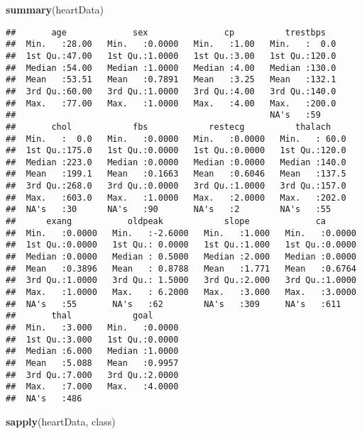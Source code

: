 \documentclass[
]{article}
\newenvironment{Shaded}{\begin{snugshade}}{\end{snugshade}}
\newcommand{\KeywordTok}[1]{\textcolor[rgb]{0.13,0.29,0.53}{\textbf{#1}}}
\newcommand{\NormalTok}[1]{#1}
\begin{document}
\begin{Shaded}
\begin{Highlighting}[]
\KeywordTok{summary}\NormalTok{(heartData)}
\end{Highlighting}
\end{Shaded}

\begin{verbatim}
##       age             sex               cp          trestbps    
##  Min.   :28.00   Min.   :0.0000   Min.   :1.00   Min.   :  0.0  
##  1st Qu.:47.00   1st Qu.:1.0000   1st Qu.:3.00   1st Qu.:120.0  
##  Median :54.00   Median :1.0000   Median :4.00   Median :130.0  
##  Mean   :53.51   Mean   :0.7891   Mean   :3.25   Mean   :132.1  
##  3rd Qu.:60.00   3rd Qu.:1.0000   3rd Qu.:4.00   3rd Qu.:140.0  
##  Max.   :77.00   Max.   :1.0000   Max.   :4.00   Max.   :200.0  
##                                                  NA's   :59     
##       chol            fbs            restecg          thalach     
##  Min.   :  0.0   Min.   :0.0000   Min.   :0.0000   Min.   : 60.0  
##  1st Qu.:175.0   1st Qu.:0.0000   1st Qu.:0.0000   1st Qu.:120.0  
##  Median :223.0   Median :0.0000   Median :0.0000   Median :140.0  
##  Mean   :199.1   Mean   :0.1663   Mean   :0.6046   Mean   :137.5  
##  3rd Qu.:268.0   3rd Qu.:0.0000   3rd Qu.:1.0000   3rd Qu.:157.0  
##  Max.   :603.0   Max.   :1.0000   Max.   :2.0000   Max.   :202.0  
##  NA's   :30      NA's   :90       NA's   :2        NA's   :55     
##      exang           oldpeak            slope             ca        
##  Min.   :0.0000   Min.   :-2.6000   Min.   :1.000   Min.   :0.0000  
##  1st Qu.:0.0000   1st Qu.: 0.0000   1st Qu.:1.000   1st Qu.:0.0000  
##  Median :0.0000   Median : 0.5000   Median :2.000   Median :0.0000  
##  Mean   :0.3896   Mean   : 0.8788   Mean   :1.771   Mean   :0.6764  
##  3rd Qu.:1.0000   3rd Qu.: 1.5000   3rd Qu.:2.000   3rd Qu.:1.0000  
##  Max.   :1.0000   Max.   : 6.2000   Max.   :3.000   Max.   :3.0000  
##  NA's   :55       NA's   :62        NA's   :309     NA's   :611     
##       thal            goal       
##  Min.   :3.000   Min.   :0.0000  
##  1st Qu.:3.000   1st Qu.:0.0000  
##  Median :6.000   Median :1.0000  
##  Mean   :5.088   Mean   :0.9957  
##  3rd Qu.:7.000   3rd Qu.:2.0000  
##  Max.   :7.000   Max.   :4.0000  
##  NA's   :486
\end{verbatim}

\begin{Shaded}
\begin{Highlighting}[]
\KeywordTok{sapply}\NormalTok{(heartData, class)}
\end{Highlighting}
\end{Shaded}
\end{document}
